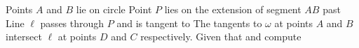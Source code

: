 Points $A$ and $B$ lie on circle   Point $P$ lies on the extension of segment $AB$ past   Line $\ell$ passes through $P$ and is tangent to   The tangents to $\omega$ at points $A$ and $B$ intersect $\ell$ at points $D$ and $C$ respectively.  Given that   and  compute 
